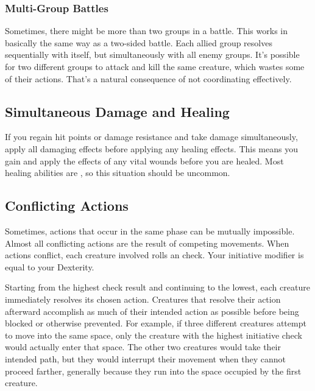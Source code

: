         \subsubsection{Multi-Group Battles}\label{Multi-Group Battles}
            Sometimes, there might be more than two groups in a battle.
            This works in basically the same way as a two-sided battle.
            Each allied group resolves sequentially with itself, but simultaneously with all enemy groups.
            It's possible for two different groups to attack and kill the same creature, which wastes some of their actions.
            That's a natural consequence of not coordinating effectively.

        \subsection{Simultaneous Damage and Healing}\label{Simultaneous Damage and Healing}
            If you regain hit points or damage resistance and take damage simultaneously, apply all damaging effects before applying any healing effects.
            This means you gain and apply the effects of any vital wounds before you are healed.
            Most healing abilities are , so this situation should be uncommon.

    \subsection{Conflicting Actions}\label{Conflicting Actions}
        Sometimes, actions that occur in the same phase can be mutually impossible.
        Almost all conflicting actions are the result of competing movements.
        When actions conflict, each creature involved rolls an  check.
        Your initiative modifier is equal to your Dexterity.

        Starting from the highest check result and continuing to the lowest, each creature immediately resolves its chosen action.
        Creatures that resolve their action afterward accomplish as much of their intended action as possible before being blocked or otherwise prevented.
        For example, if three different creatures attempt to move into the same space, only the creature with the highest initiative check would actually enter that space.
        The other two creatures would take their intended path, but they would interrupt their movement when they cannot proceed farther, generally because they run into the space occupied by the first creature.

